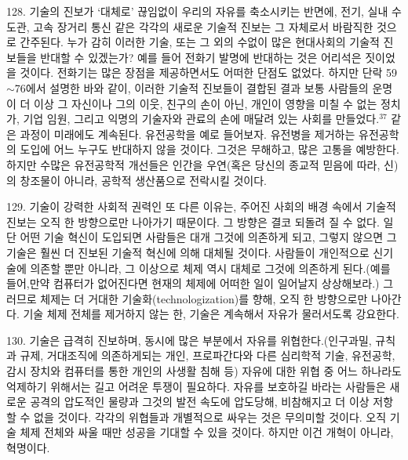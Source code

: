 \documentclass[11pt,a4paper]{article}
\begin{document}
\begin{multicols}{2}
128. 기술의 진보가 `대체로' 끊임없이 우리의 자유를 축소시키는 반면에, 전기, 실내 수도관, 고속  장거리 통신 같은 각각의 새로운 기술적 진보는 그 자체로서 바람직한 것으로 간주된다. 누가 감히 이러한 기술, 또는 그 외의 수없이 많은 현대사회의 기술적 진보들을 반대할 수 있겠는가? 예를 들어 전화기  발명에 반대하는 것은 어리석은 짓이었을 것이다. 전화기는 많은 장점을 제공하면서도 어떠한 단점도  없었다. 하지만 단락 59${\sim}$76에서 설명한 바와 같이, 이러한 기술적 진보들이 결합된 결과 보통 사람들의  운명이 더 이상 그 자신이나 그의 이웃, 친구의 손이 아닌, 개인이 영향을 미칠 수 없는 정치가, 기업 임원, 그리고 익명의 기술자와 관료의 손에 매달려 있는 사회를 만들었다.\hyperlink{37}{$^{37}$} 같은 과정이 미래에도 계속된다.  유전공학을 예로 들어보자. 유전병을 제거하는 유전공학의 도입에 어느 누구도 반대하지 않을 것이다.  그것은 무해하고, 많은 고통을 예방한다. 하지만 수많은 유전공학적 개선들은 인간을 우연(혹은 당신의  종교적 믿음에 따라, 신)의 창조물이 아니라, 공학적 생산품으로 전락시킬 것이다. 


129. 기술이 강력한 사회적 권력인 또 다른 이유는, 주어진 사회의 배경 속에서 기술적 진보는 오직 한  방향으로만 나아가기 때문이다. 그 방향은 결코 되돌려 질 수 없다. 일단 어떤 기술 혁신이 도입되면  사람들은 대개 그것에 의존하게 되고, 그렇지 않으면 그 기술은 훨씬 더 진보된 기술적 혁신에 의해  대체될 것이다. 사람들이 개인적으로 신기술에 의존할 뿐만 아니라, 그 이상으로 체제 역시 대체로 그것에 의존하게 된다.(예를 들어,만약 컴퓨터가 없어진다면 현재의 체제에 어떠한 일이 일어날지 상상해보라.)  그러므로 체제는 더 거대한 기술화(technologization)를 향해, 오직 한 방향으로만 나아간다. 기술 체제  전체를 제거하지 않는 한, 기술은 계속해서 자유가 물러서도록 강요한다. 


130. 기술은 급격히 진보하며, 동시에 많은 부분에서 자유를 위협한다.(인구과밀, 규칙과 규제,  거대조직에 의존하게되는 개인, 프로파간다와 다른 심리학적 기술, 유전공학, 감시 장치와 컴퓨터를 통한  개인의 사생활 침해 등) 자유에 대한 위협 중 어느 하나라도 억제하기 위해서는 길고 어려운 투쟁이  필요하다. 자유를 보호하길 바라는 사람들은 새로운 공격의 압도적인 물량과 그것의 발전 속도에  압도당해, 비참해지고 더 이상 저항할 수 없을 것이다. 각각의 위협들과 개별적으로 싸우는 것은 무의미할 것이다. 오직 기술 체제 전체와 싸울 때만 성공을 기대할 수 있을 것이다. 하지만 이건 개혁이 아니라,  혁명이다. 



\end{multicols}
\end{document}
